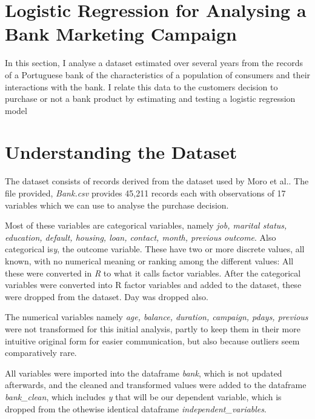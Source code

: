 \documentclass[9pt,technote]{IEEEtran}
\begin{document}

\section{Logistic Regression for Analysing a Bank Marketing Campaign}

In this section, I analyse a dataset estimated over several years from the records of a Portuguese bank of the characteristics of a population of consumers and their interactions with the bank.  I relate this data to the customers decision to purchase or not a bank product by estimating and testing a logistic regression model   

\section{Understanding the Dataset}

The dataset consists of records derived from the dataset used by Moro et al.\cite{moro14}.  The file provided, \textit{Bank.csv} provides 45,211 records each with observations of 17 variables which we can use to analyse the purchase decision.  

Most of these variables are categorical variables, namely \textit{job, marital status, education, default, housing, loan, contact, month, previous outcome}.  Also categorical is\textit{y}, the outcome variable.  These have two or more discrete values, all known, with no numerical meaning or ranking among the different values: All these were converted in \textit{R} to what it calls factor variables.  After the categorical variables were converted into R factor variables and added to the dataset, these were dropped from the dataset.  Day was dropped also.  

The numerical variables namely \textit{age, balance, duration, campaign, pdays, previous} were not transformed for this initial analysis, partly to keep them in their more intuitive original form for easier communication, but also because outliers seem comparatively rare.  

All variables were imported into the dataframe \textit{bank}, which is not updated afterwards, and the cleaned and transformed values were added to the dataframe \textit{bank\_clean}, which includes \textit{y} that will be our dependent variable, which is dropped from the othewise identical dataframe \textit{independent\_variables}.  
\end{document}
